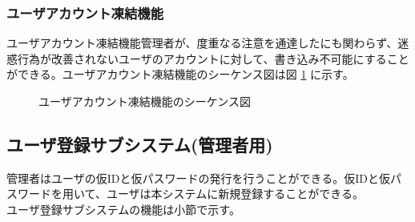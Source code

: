 \documentclass[a4j]{jarticle}
\begin{document}
 \subsubsection{ユーザアカウント凍結機能}
 ユーザアカウント凍結機能管理者が、度重なる注意を通達したにも関わらず、迷惑行為が改善されないユーザのアカウントに対して、書き込み不可能にすることができる。ユーザアカウント凍結機能のシーケンス図は図 \ref{fig:admin_user-suspend.png} に示す。
               \begin{figure}[H]
\centering
{}
\caption{ユーザアカウント凍結機能のシーケンス図}
\label{fig:admin_user-suspend.png}
\end{figure}
 \subsection{ユーザ登録サブシステム(管理者用)}
 管理者はユーザの仮IDと仮パスワードの発行を行うことができる。仮IDと仮パスワードを用いて、ユーザは本システムに新規登録することができる。\\
 ユーザ登録サブシステムの機能は小節で示す。
\end{document}

